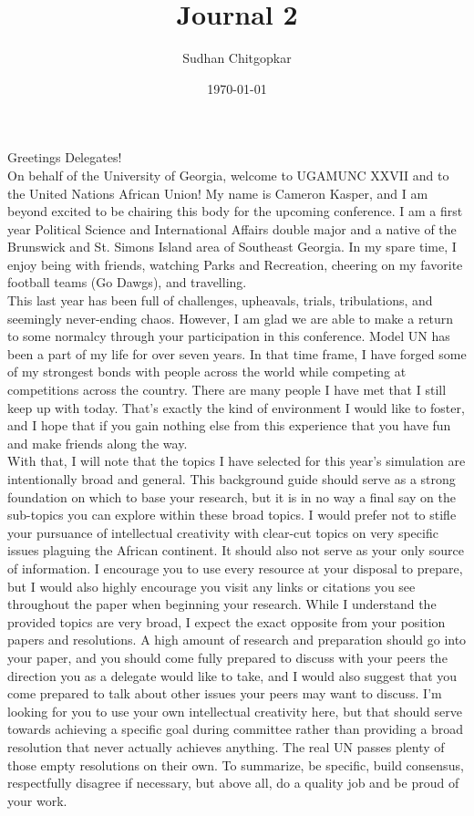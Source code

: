 \documentclass[10pt, letterpaper]{article}
\title{Journal 2}
\author{Sudhan Chitgopkar}
\date{\today}
\begin{document}
Greetings Delegates! \\

On behalf of the University of Georgia, welcome to
UGAMUNC XXVII and to the United Nations African Union! My name is
Cameron Kasper, and I am beyond excited to be chairing this body for the
upcoming conference. I am a first year Political Science and
International Affairs double major and a native of the Brunswick and St.
Simons Island area of Southeast Georgia. In my spare time, I enjoy being
with friends, watching Parks and Recreation, cheering on my favorite
football teams (Go Dawgs), and travelling. \\

This last year has been full of challenges, upheavals, trials,
tribulations, and seemingly never-ending chaos. However, I am glad we
are able to make a return to some normalcy through your participation in
this conference. Model UN has been a part of my life for over seven
years. In that time frame, I have forged some of my strongest bonds with
people across the world while competing at competitions across the
country. There are many people I have met that I still keep up with
today. That's exactly the kind of environment I would like to foster,
and I hope that if you gain nothing else from this experience that you
have fun and make friends along the way. \\

With that, I will note that the topics I have selected for this year's
simulation are intentionally broad and general. This background guide
should serve as a strong foundation on which to base your research, but
it is in no way a final say on the sub-topics you can explore within
these broad topics. I would prefer not to stifle your pursuance of
intellectual creativity with clear-cut topics on very specific issues
plaguing the African continent. It should also not serve as your only
source of information. I encourage you to use every resource at your
disposal to prepare, but I would also highly encourage you visit any
links or citations you see throughout the paper when beginning your
research. While I understand the provided topics are very broad, I
expect the exact opposite from your position papers and resolutions. A
high amount of research and preparation should go into your paper, and
you should come fully prepared to discuss with your peers the direction
you as a delegate would like to take, and I would also suggest that you
come prepared to talk about other issues your peers may want to discuss.
I'm looking for you to use your own intellectual creativity here, but
that should serve towards achieving a specific goal during committee
rather than providing a broad resolution that never actually achieves
anything. The real UN passes plenty of those empty resolutions on their
own. To summarize, be specific, build consensus, respectfully disagree
if necessary, but above all, do a quality job and be proud of your work. \\
\end{document}
